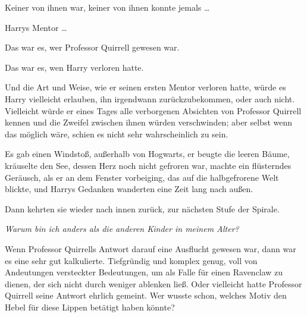 Keiner von ihnen war, keiner von ihnen konnte jemals …

Harrys Mentor …

Das war es, wer Professor Quirrell gewesen war.

Das war es, wen Harry verloren hatte.

Und die Art und Weise, wie er seinen ersten Mentor verloren hatte, würde es Harry vielleicht erlauben, ihn irgendwann zurückzubekommen, oder auch nicht. Vielleicht würde er eines Tages alle verborgenen Absichten von Professor Quirrell kennen und die Zweifel zwischen ihnen würden verschwinden; aber selbst wenn das möglich wäre, schien es nicht sehr wahrscheinlich zu sein.

Es gab einen Windstoß, außerhalb von Hogwarts, er beugte die leeren Bäume, kräuselte den See, dessen Herz noch nicht gefroren war, machte ein flüsterndes Geräusch, als er an dem Fenster vorbeiging, das auf die halbgefrorene Welt blickte, und Harrys Gedanken wanderten eine Zeit lang nach außen.

Dann kehrten sie wieder nach innen zurück, zur nächsten Stufe der Spirale.

\emph{Warum bin ich anders als die anderen Kinder in meinem Alter?}

Wenn Professor Quirrells Antwort darauf eine Ausflucht gewesen war, dann war es eine sehr gut kalkulierte. Tiefgründig und komplex genug, voll von Andeutungen versteckter Bedeutungen, um als Falle für einen Ravenclaw zu dienen, der sich nicht durch weniger ablenken ließ. Oder vielleicht hatte Professor Quirrell seine Antwort ehrlich gemeint. Wer wusste schon, welches Motiv den Hebel für diese Lippen betätigt haben könnte?

